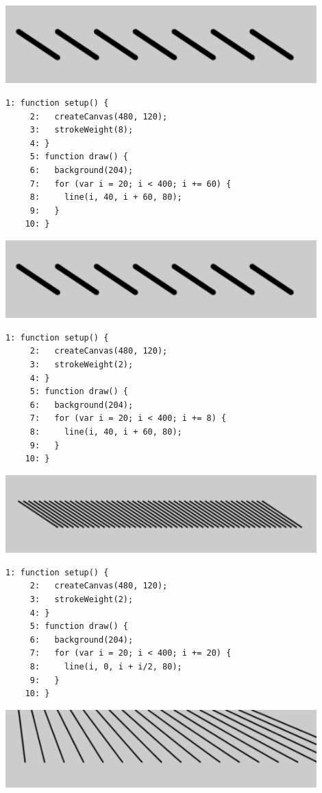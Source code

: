 \documentclass[a4j]{ltjsarticle}
\begin{document}
\includegraphics[height=3cm]{image/Ex_04_05.pdf}
\begin{lstlisting}[caption=Ex\_04\_06.js]
     1: function setup() {
     2:   createCanvas(480, 120);
     3:   strokeWeight(8);
     4: }
     5: function draw() {
     6:   background(204);  
     7:   for (var i = 20; i < 400; i += 60) {
     8:     line(i, 40, i + 60, 80);
     9:   }
    10: }
\end{lstlisting}
\includegraphics[height=3cm]{image/Ex_04_06.pdf}
\begin{lstlisting}[caption=Ex\_04\_07.js]
     1: function setup() {
     2:   createCanvas(480, 120);
     3:   strokeWeight(2);
     4: }
     5: function draw() {
     6:   background(204);  
     7:   for (var i = 20; i < 400; i += 8) {
     8:     line(i, 40, i + 60, 80);
     9:   }
    10: }
\end{lstlisting}
\includegraphics[height=3cm]{image/Ex_04_07.pdf}
\begin{lstlisting}[caption=Ex\_04\_08.js]
     1: function setup() {
     2:   createCanvas(480, 120);
     3:   strokeWeight(2);
     4: }
     5: function draw() {
     6:   background(204);  
     7:   for (var i = 20; i < 400; i += 20) {
     8:     line(i, 0, i + i/2, 80);
     9:   }
    10: }
\end{lstlisting}
\includegraphics[height=3cm]{image/Ex_04_08.pdf}
\end{document}
